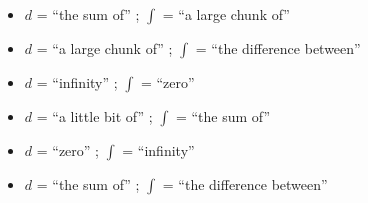 \begin{itemize}
\item{} $d$ = ``the sum of'' ; $\int$ = ``a large chunk of''
\vskip 10pt 
\item{} $d$ = ``a large chunk of'' ; $\int$ = ``the difference between''
\vskip 10pt 
\item{} $d$ = ``infinity'' ; $\int$ = ``zero''
\vskip 10pt 
\item{} $d$ = ``a little bit of'' ; $\int$ = ``the sum of'' 
\vskip 10pt 
\item{} $d$ = ``zero'' ; $\int$ = ``infinity''
\vskip 10pt 
\item{} $d$ = ``the sum of'' ; $\int$ = ``the difference between''
\end{itemize}






